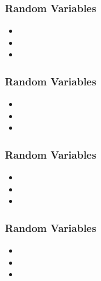 \documentclass{beamer}
\begin{document}
\begin{frame}
\frametitle{Random Variables}
\Large
\begin{itemize}
\item
\item
\item
\end{itemize}
\end{frame}
\begin{frame}
\frametitle{Random Variables}
\Large
\begin{itemize}
\item
\item
\item
\end{itemize}
\end{frame}
\begin{frame}
\frametitle{Random Variables}
\Large
\begin{itemize}
\item
\item
\item
\end{itemize}
\end{frame}
\begin{frame}
\frametitle{Random Variables}
\Large
\begin{itemize}
\item
\item
\item
\end{itemize}
\end{frame}
\end{document}

